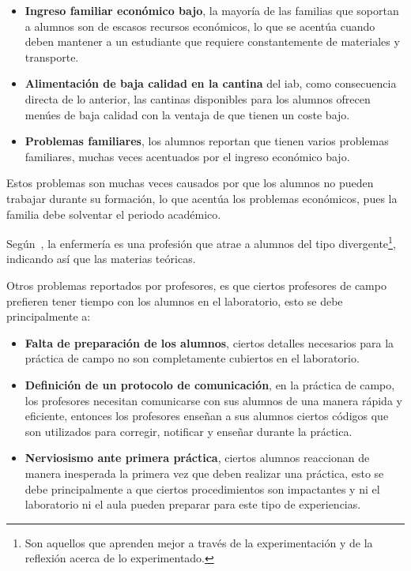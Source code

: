 \begin{itemize}
    \item \textbf{Ingreso familiar económico bajo}, la mayoría de las familias que
        soportan a alumnos son de escasos recursos económicos, lo que se acentúa
        cuando deben mantener a un estudiante que requiere constantemente de
        materiales y transporte.
    \item \textbf{Alimentación de baja calidad en la cantina} del \Gls{iab}, como
        consecuencia directa de lo anterior, las cantinas disponibles para los
        alumnos ofrecen menúes de baja calidad con la ventaja de que tienen un
        coste bajo.
    \item \textbf{Problemas familiares}, los alumnos reportan que tienen varios
        problemas familiares, muchas veces acentuados por el ingreso económico
        bajo.
\end{itemize}


Estos problemas son muchas veces causados por que los alumnos no pueden trabajar
durante su formación, lo que acentúa los problemas económicos, pues la familia
debe solventar el periodo académico.

Según~\cite{humphreys2013developing}, la enfermería es una profesión que atrae a
alumnos del tipo divergente\footnote{Son aquellos que aprenden mejor a través de
    la experimentación y de la reflexión acerca de lo experimentado.}, indicando
así que las materias teóricas.

Otros problemas reportados por profesores, es que ciertos profesores de campo
prefieren tener tiempo con los alumnos en el laboratorio, esto se debe
principalmente a:

\begin{itemize}
    \item \textbf{Falta de preparación de los alumnos}, ciertos detalles necesarios para
        la práctica de campo no son completamente cubiertos en el laboratorio.
    \item \textbf{Definición de un protocolo de comunicación}, en la práctica de campo,
        los profesores necesitan comunicarse con sus alumnos de una manera
        rápida y eficiente, entonces los profesores enseñan a sus alumnos
        ciertos códigos que son utilizados para corregir, notificar y enseñar
        durante la práctica.
    \item \textbf{Nerviosismo ante primera práctica}, ciertos alumnos reaccionan de
        manera inesperada la primera vez que deben realizar una práctica, esto
        se debe principalmente a que ciertos procedimientos son impactantes y
        ni el laboratorio ni el aula pueden preparar para este tipo de
        experiencias.
\end{itemize}

